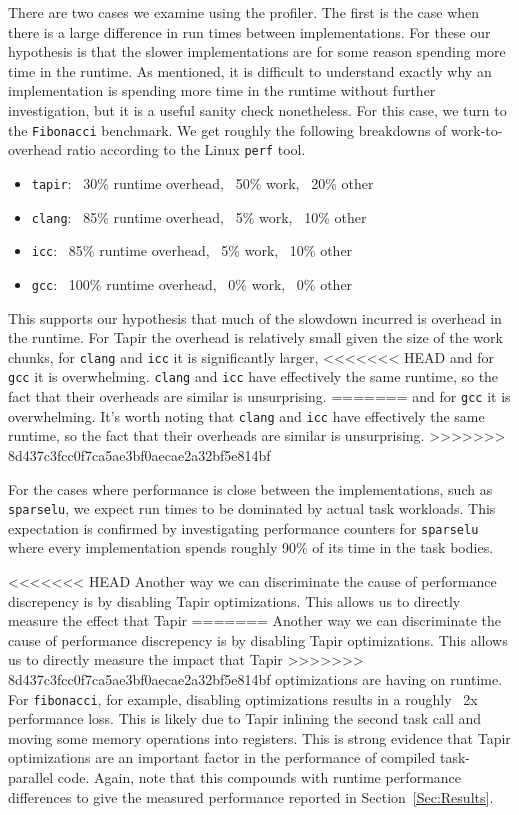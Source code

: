 \documentclass[sigconf]{acmart}
\begin{document}
There are two cases we examine using the profiler. The first is the case when
there is a large difference in run times between implementations. For these our
hypothesis is that the slower implementations are for some reason spending more
time in the runtime. As mentioned, it is difficult to understand exactly why an
implementation is spending more time in the runtime without further
investigation, but it is a useful sanity check nonetheless. For this case, we
turn to the \texttt{Fibonacci} benchmark.  We get roughly the following
breakdowns of work-to-overhead ratio according to the Linux \texttt{perf} tool.
\begin{itemize}
\item \texttt{tapir}: ~30\% runtime overhead, ~50\% work, ~20\% other
\item \texttt{clang}: ~85\% runtime overhead, ~5\% work, ~10\% other
\item \texttt{icc}: ~85\% runtime overhead, ~5\% work, ~10\% other
\item \texttt{gcc}: ~100\% runtime overhead, ~0\% work, ~0\% other
\end{itemize}
This supports our hypothesis that much of the slowdown incurred is overhead in
the runtime. For Tapir the overhead is relatively small given the size of the
work chunks, for \texttt{clang} and \texttt{icc} it is significantly larger,
<<<<<<< HEAD
and for \texttt{gcc} it is overwhelming. \texttt{clang} 
and \texttt{icc} have effectively the same runtime, so the fact that their 
overheads are similar is unsurprising. 
=======
and for \texttt{gcc} it is overwhelming. It's worth noting that \texttt{clang}
and \texttt{icc} have effectively the same runtime, so the fact that their
overheads are similar is unsurprising.
>>>>>>> 8d437c3fcc0f7ca5ae3bf0aecae2a32bf5e814bf

For the cases where performance is close between the implementations, such as
\texttt{sparselu}, we expect run times to be dominated by actual task workloads. This
expectation is confirmed by investigating performance counters for \texttt{sparselu}
where every implementation spends roughly 90\% of its time in the task
bodies.

<<<<<<< HEAD
Another way we can discriminate the cause of performance discrepency is by disabling 
Tapir optimizations. This allows us to directly measure the effect that Tapir
=======
Another way we can discriminate the cause of performance discrepency is by disabling
Tapir optimizations. This allows us to directly measure the impact that Tapir
>>>>>>> 8d437c3fcc0f7ca5ae3bf0aecae2a32bf5e814bf
optimizations are having on runtime. For \texttt{fibonacci}, for example,
disabling optimizations results in a roughly ~2x performance loss. This is
likely due to Tapir inlining the second task call and moving some memory
operations into registers. This is strong evidence that Tapir optimizations are
an important factor in the performance of compiled task-parallel code. Again,
note that this compounds with runtime performance differences to give the
measured performance reported in Section~\ref{Sec:Results}.
\end{document}
